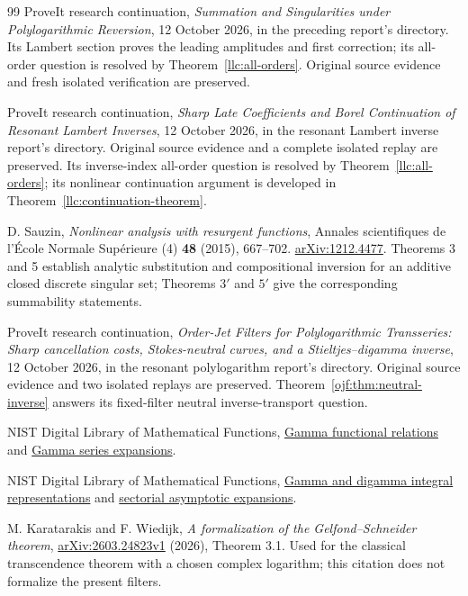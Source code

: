 \begin{thebibliography}{99}
ProveIt research continuation, \emph{Summation and Singularities under
Polylogarithmic Reversion}, 12 October 2026, in the preceding report's
 directory.
Its Lambert section proves the leading amplitudes and first correction;
its all-order question is resolved by Theorem~\ref{llc:all-orders}.
Original source evidence and fresh isolated verification are preserved.

ProveIt research continuation, \emph{Sharp Late Coefficients and Borel
Continuation of Resonant Lambert Inverses}, 12 October 2026, in the
resonant Lambert inverse report's 
directory. Original source evidence and a complete isolated replay are
preserved. Its inverse-index all-order question is resolved by
Theorem~\ref{llc:all-orders}; its nonlinear continuation argument is
developed in Theorem~\ref{llc:continuation-theorem}.

D. Sauzin, \emph{Nonlinear analysis with resurgent functions},
Annales scientifiques de l'\'Ecole Normale Sup\'erieure (4) \textbf{48}
(2015), 667--702. \href{https://arxiv.org/abs/1212.4477}{arXiv:1212.4477}.
Theorems 3 and 5 establish analytic substitution and compositional
inversion for an additive closed discrete singular set; Theorems $3'$
and $5'$ give the corresponding summability statements.


ProveIt research continuation, \emph{Order-Jet Filters for Polylogarithmic
Transseries: Sharp cancellation costs, Stokes-neutral curves, and a
Stieltjes--digamma inverse}, 12 October 2026, in the resonant polylogarithm
report's  directory.
Original source evidence and two isolated replays are preserved.
Theorem~\ref{ojf:thm:neutral-inverse} answers its fixed-filter
neutral inverse-transport question.

NIST Digital Library of Mathematical Functions,
\href{https://dlmf.nist.gov/5.5}{Gamma functional relations} and
\href{https://dlmf.nist.gov/5.7}{Gamma series expansions}.

NIST Digital Library of Mathematical Functions,
\href{https://dlmf.nist.gov/5.9}{Gamma and digamma integral representations}
and \href{https://dlmf.nist.gov/5.11}{sectorial asymptotic expansions}.

M. Karatarakis and F. Wiedijk, \emph{A formalization of the
Gelfond--Schneider theorem},
\href{https://arxiv.org/abs/2603.24823}{arXiv:2603.24823v1} (2026),
Theorem 3.1. Used for the classical transcendence theorem with a chosen
complex logarithm; this citation does not formalize the present filters.


\end{thebibliography}
